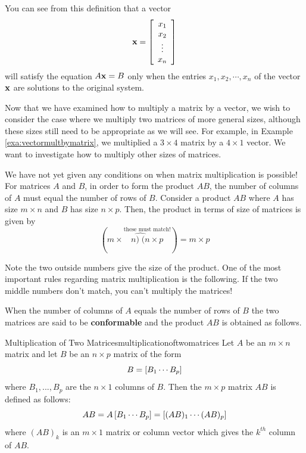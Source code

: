 You can see from this definition that a vector 
\begin{equation*}
\mathbf{x} =
\left[
\begin{array}{c}
x_{1} \\
x_{2} \\
\vdots \\
x_{n}
\end{array}
\right]
\end{equation*}
will satisfy the equation $A\mathbf{x}=B$
only when the entries $x_{1}, x_{2}, \cdots, x_{n}$ of the vector $\mathbf{x}$ are solutions to the original system.

Now that we have examined how to multiply a matrix by a vector, we
wish to consider the case where we multiply two matrices of more
general sizes, although these sizes still need to be appropriate as we
will see. For example, in Example \ref{exa:vectormultbymatrix}, we
multiplied a $3 \times 4$ matrix by a $4 \times 1$ vector.  We want to
investigate how to multiply other sizes of matrices.

We have not yet given any conditions on when matrix multiplication is
possible!  For matrices $A$ and $B$, in order to form the product
$AB$, the number of columns of $A$ must equal the number of rows of
$B.$ Consider a product $AB$ where $A$ has size $m\times n$ and $B$
has size $n \times p$. Then, the product in terms of size of matrices
is given by
\begin{equation*}
(m\times\overset{\text{these must match!}}{\widehat{n)\;(n}\times p})=m\times p
\end{equation*}

Note the two outside numbers give the size of the product. One of the most important rules regarding matrix multiplication is the following. 
If the two middle numbers don't match, you can't multiply the
matrices!

When the number of columns of $A$ equals the number of rows
of $B$ the two matrices are said to be \textbf{conformable}
 and the product $AB$ is obtained
 as follows.

\begin{definition}{Multiplication of Two Matrices}{multiplicationoftwomatrices}
 Let $A$ be an $m\times n$ matrix
and let $B$ be an $n\times p$ matrix of the form
\begin{equation*}
B=\left[ B_{1} \cdots  B_{p}\right]
\end{equation*}
where $B_{1},...,B_{p}$ are the $n\times 1$ columns of $B$. Then the 
$m\times p$ matrix $AB$ is defined as follows:
\begin{equation*}
AB = A \left[ B_{1} \cdots  B_{p}\right] =  \left[ (A B)_{1} \cdots  (AB)_{p}\right] 
\end{equation*}
where $(AB)_{k}$ is an $m\times 1$ matrix or column vector which
gives the $k^{th}$ column of $AB$. 
\end{definition}

